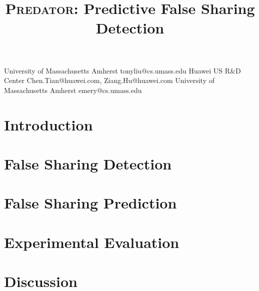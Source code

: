 \documentclass[10pt]{sigplanconf}
\date{} %
\newcommand{\Predator}{{\scshape Predator}}
\begin{document}


\title{\Predator{}: Predictive False Sharing Detection}

           {University of Massachusetts Amherst}
           {tonyliu@cs.umass.edu}
           {Huawei US R\&D Center}
           {Chen.Tian@huawei.com, Ziang.Hu@huawei.com}
           {University of Massachusetts Amherst}
           {emery@cs.umass.edu}

\maketitle

\begin{abstract}

\end{abstract}

\begin{comment}
\category{CR-number}{subcategory}{third-level}

\terms
term1, term2

\keywords
keyword1, keyword2
\end{comment}

\section{Introduction}



\section{False Sharing Detection}


\section{False Sharing Prediction}


\section{Experimental Evaluation}


\section{Discussion}

\end{document}
